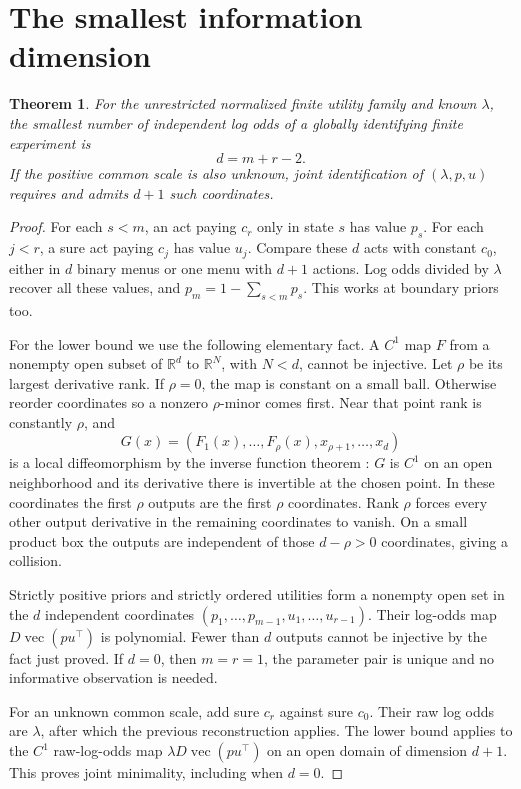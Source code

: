 \documentclass[11pt]{article}
\newtheorem{theorem}{Theorem}
\newcommand{\R}{\mathbb R}
\begin{document}
\section{The smallest information dimension}
\begin{theorem}\label{design}
For the unrestricted normalized finite utility family and known $\lambda$, the smallest number of independent log odds of a globally identifying finite experiment is
\[
 d=m+r-2.
\]
If the positive common scale is also unknown, joint identification of $(\lambda,p,u)$ requires and admits $d+1$ such coordinates.
\end{theorem}
\begin{proof}
For each $s<m$, an act paying $c_r$ only in state $s$ has value $p_s$. For each $j<r$, a sure act paying $c_j$ has value $u_j$. Compare these $d$ acts with constant $c_0$, either in $d$ binary menus or one menu with $d+1$ actions. Log odds divided by $\lambda$ recover all these values, and $p_m=1-\sum_{s<m}p_s$. This works at boundary priors too.

For the lower bound we use the following elementary fact. A $C^1$ map $F$ from a nonempty open subset of $\R^d$ to $\R^N$, with $N<d$, cannot be injective. Let $\rho$ be its largest derivative rank. If $\rho=0$, the map is constant on a small ball. Otherwise reorder coordinates so a nonzero $\rho$-minor comes first. Near that point rank is constantly $\rho$, and
\[
 G(x)=(F_1(x),\ldots,F_\rho(x),x_{\rho+1},\ldots,x_d)
\]
is a local diffeomorphism by the inverse function theorem \cite[Theorem 9.24]{Rudin}: $G$ is $C^1$ on an open neighborhood and its derivative there is invertible at the chosen point. In these coordinates the first $\rho$ outputs are the first $\rho$ coordinates. Rank $\rho$ forces every other output derivative in the remaining coordinates to vanish. On a small product box the outputs are independent of those $d-\rho>0$ coordinates, giving a collision.

Strictly positive priors and strictly ordered utilities form a nonempty open set in the $d$ independent coordinates $(p_1,\ldots,p_{m-1},u_1,\ldots,u_{r-1})$. Their log-odds map $D\operatorname{vec}(pu^\top)$ is polynomial. Fewer than $d$ outputs cannot be injective by the fact just proved. If $d=0$, then $m=r=1$, the parameter pair is unique and no informative observation is needed.

For an unknown common scale, add sure $c_r$ against sure $c_0$. Their raw log odds are $\lambda$, after which the previous reconstruction applies. The lower bound applies to the $C^1$ raw-log-odds map $\lambda D\operatorname{vec}(pu^\top)$ on an open domain of dimension $d+1$. This proves joint minimality, including when $d=0$.
\end{proof}
\end{document}
